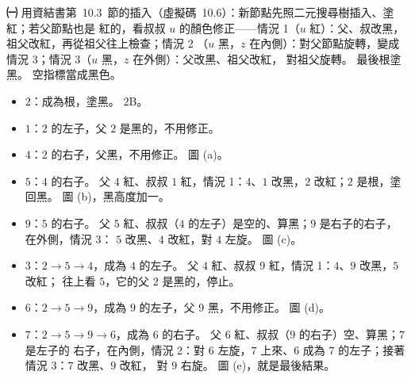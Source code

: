 \begin{pastsoln}
\textbf{㈠} 用資結書第~10.3~節的插入（虛擬碼~10.6）：新節點先照二元搜尋樹插入、塗紅；若父節點也是
紅的，看叔叔 $u$ 的顏色修正——情況 1（$u$ 紅）：父、叔改黑，祖父改紅，再從祖父往上檢查；情況 2
（$u$ 黑，$z$ 在內側）：對父節點旋轉，變成情況 3；情況 3（$u$ 黑，$z$ 在外側）：父改黑、祖父改紅，
對祖父旋轉。 最後根塗黑。 空指標當成黑色。
\begin{itemize}
\item $2$：成為根，塗黑。 $2$B。
\item $1$：$2$ 的左子，父 $2$ 是黑的，不用修正。
\item $4$：$2$ 的右子，父黑，不用修正。 圖 (a)。
\item $5$：$4$ 的右子。 父 $4$ 紅、叔叔 $1$ 紅，情況 1：$4$、$1$ 改黑，$2$ 改紅；$2$ 是根，塗回黑。
圖 (b)，黑高度加一。
\item $9$：$5$ 的右子。 父 $5$ 紅、叔叔（$4$ 的左子）是空的、算黑；$9$ 是右子的右子，在外側，情況 3：
$5$ 改黑、$4$ 改紅，對 $4$ 左旋。 圖 (c)。
\item $3$：$2 \to 5 \to 4$，成為 $4$ 的左子。 父 $4$ 紅、叔叔 $9$ 紅，情況 1：$4$、$9$ 改黑，$5$ 改紅；
往上看 $5$，它的父 $2$ 是黑的，停止。
\item $6$：$2 \to 5 \to 9$，成為 $9$ 的左子，父 $9$ 黑，不用修正。 圖 (d)。
\item $7$：$2 \to 5 \to 9 \to 6$，成為 $6$ 的右子。 父 $6$ 紅、叔叔（$9$ 的右子）空、算黑；$7$ 是左子的
右子，在內側，情況 2：對 $6$ 左旋，$7$ 上來、$6$ 成為 $7$ 的左子；接著情況 3：$7$ 改黑、$9$ 改紅，
對 $9$ 右旋。 圖 (e)，就是最後結果。
\end{itemize}
\begin{center}


\end{center}
\end{pastsoln}
